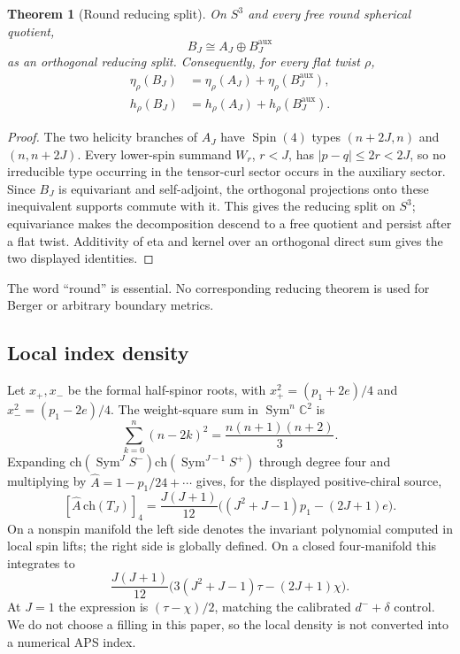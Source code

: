 \documentclass[11pt]{article}
\newtheorem{theorem}{Theorem}[section]
\theoremstyle{definition}
\newcommand{\etaInv}{\eta}
\newcommand{\Spin}{\operatorname{Spin}}
\newcommand{\aux}{\mathrm{aux}}
\begin{document}
\begin{theorem}[Round reducing split]
On $S^3$ and every free round spherical quotient,
\[
 B_J\cong A_J\oplus B_J^{\aux}
\]
as an orthogonal reducing split.  Consequently, for every flat twist $\rho$,
\begin{align}
 \etaInv_\rho(B_J)&=\etaInv_\rho(A_J)+\etaInv_\rho(B_J^{\aux}),\\
 h_\rho(B_J)&=h_\rho(A_J)+h_\rho(B_J^{\aux}).
\end{align}
\end{theorem}

\begin{proof}
The two helicity branches of $A_J$ have $\Spin(4)$ types $(n+2J,n)$ and
$(n,n+2J)$.  Every lower-spin summand $W_r$, $r<J$, has
$|p-q|\leq2r<2J$, so no irreducible type occurring in the tensor-curl sector
occurs in the auxiliary sector.  Since $B_J$ is equivariant and self-adjoint,
the orthogonal projections onto these inequivalent supports commute with it.
This gives the reducing split on $S^3$; equivariance makes the decomposition
descend to a free quotient and persist after a flat twist.  Additivity of eta
and kernel over an orthogonal direct sum gives the two displayed identities.
\end{proof}

The word ``round'' is essential.  No corresponding reducing theorem is used
for Berger or arbitrary boundary metrics.

\subsection{Local index density}

Let $x_+,x_-$ be the formal half-spinor roots, with
$x_+^2=(p_1+2e)/4$ and $x_-^2=(p_1-2e)/4$.
The weight-square sum in $\operatorname{Sym}^n\mathbb C^2$ is
\[
 \sum_{k=0}^n(n-2k)^2=\frac{n(n+1)(n+2)}3.
\]
Expanding
$\mathrm{ch}(\operatorname{Sym}^J S^-)
\mathrm{ch}(\operatorname{Sym}^{J-1}S^+)$ through degree four and multiplying
by $\widehat A=1-p_1/24+\cdots$ gives, for the displayed positive-chiral
source,
\[
[\widehat A\,\mathrm{ch}(T_J)]_4
 =\frac{J(J+1)}{12}
\bigl((J^2+J-1)p_1-(2J+1)e\bigr).
\]
On a nonspin manifold the left side denotes the invariant polynomial
computed in local spin lifts; the right side is globally defined.
On a closed four-manifold this integrates to
\[
 \frac{J(J+1)}{12}
 \bigl(3(J^2+J-1)\tau-(2J+1)\chi\bigr).
\]
At $J=1$ the expression is $(\tau-\chi)/2$, matching the calibrated
$d^-+\delta$ control.  We do not choose a filling in this paper, so the local
density is not converted into a numerical APS index.
\end{document}
